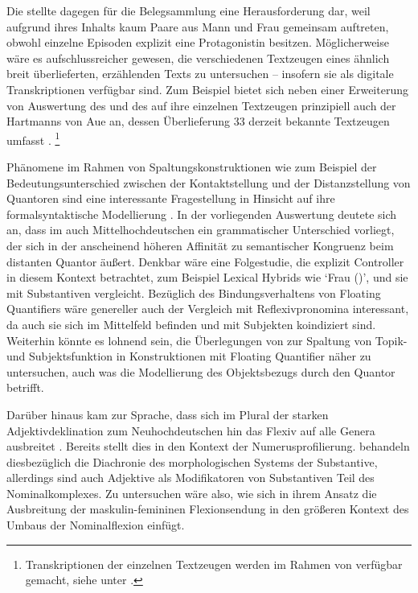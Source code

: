 Die \KC{} stellte dagegen für die Belegsammlung eine Herausforderung
dar, weil aufgrund ihres Inhalts kaum Paare aus Mann und Frau gemeinsam
auftreten, obwohl einzelne Episoden explizit eine Protagonistin besitzen.
Möglicherweise wäre es aufschlussreicher gewesen, die verschiedenen Textzeugen
eines ähnlich breit überlieferten, erzählenden Texts zu untersuchen -- insofern
sie als digitale Transkriptionen verfügbar sind. Zum Beispiel bietet sich neben
einer Erweiterung von  Auswertung des
 und des  auf ihre einzelnen Textzeugen prinzipiell
auch der  Hartmanns von Aue an, dessen Überlieferung 33 derzeit
bekannte Textzeugen umfasst \autocites[vgl.][s.\,v.~\textit{Hartmann von Aue:
}]{hsc}.%
%
	\footnote{Transkriptionen der einzelnen Textzeugen werden im Rahmen von
		 verfügbar gemacht, siehe unter
		.%
	}

Phänomene im Rahmen von Spaltungskonstruktionen wie zum Beispiel der
Bedeutungs\-unterschied zwischen der Kontaktstellung und der Distanzstellung
von Quantoren sind eine interessante Fragestellung in Hinsicht auf ihre
formal\-syntaktische Modellierung \autocite[siehe
z.\,B.][]{pittner1995,merchant1996,fanselowcavar2002,nolda2007,shen2019}. In
der vorliegenden Auswertung deutete sich an, dass im auch Mittelhochdeutschen
ein grammatischer Unterschied vorliegt, der sich in der anscheinend höheren
Affinität zu semantischer Kongruenz beim distanten Quantor äußert. Denkbar wäre
eine Folgestudie, die explizit  Controller in diesem Kontext
betrachtet, zum Beispiel Lexical Hybrids wie  `Frau (\NeutF)',
und sie mit  Substantiven vergleicht. Bezüglich des
Bindungsverhaltens von Floating Quantifiers wäre genereller auch der Vergleich
mit Reflexivpronomina interessant, da auch sie sich im Mittelfeld befinden und
mit Subjekten koindiziert sind. Weiterhin könnte es lohnend sein, die
Überlegungen von \citet{spector2009} zur Spaltung von Topik- und
Subjektsfunktion in Konstruktionen mit Floating Quantifier näher zu
untersuchen, auch was die Modellierung des Objektsbezugs durch den Quantor
betrifft.

Darüber hinaus kam zur Sprache, dass sich im Plural der starken
Adjektivdeklination zum Neuhochdeutschen hin das Flexiv  auf alle
Genera ausbreitet \autocite[vgl.][191--192]{reichmannwegera1993}. Bereits
\citet{askedal1973} stellt dies in den Kontext der Numerusprofilierung.
\citet{dammelgillmann2014} behandeln diesbezüglich die Diachronie des
morphologischen Systems der Substantive, allerdings sind auch Adjektive als
Modifikatoren von Substantiven Teil des Nominalkomplexes. Zu untersuchen wäre
also, wie sich in ihrem Ansatz die Ausbreitung der maskulin-femininen
Flexionsendung in den größeren Kontext des Umbaus der Nominal\-flexion einfügt.

